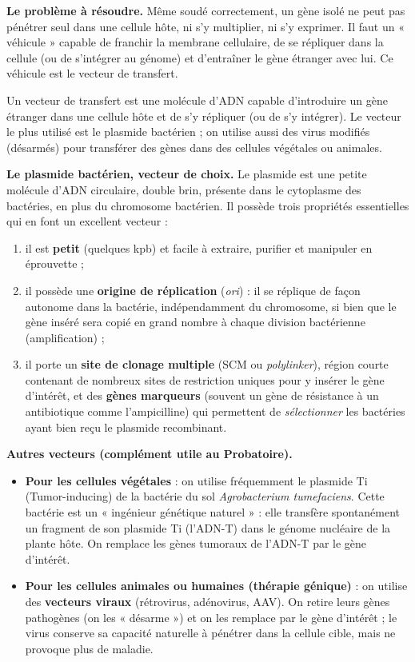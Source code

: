 \documentclass[11pt]{article}
\newcommand{\cle}[1]{{\popxbold\color{popdark}#1}}
\begin{document}
\textbf{Le problème à résoudre.} Même soudé correctement, un gène isolé ne peut pas pénétrer seul dans une cellule hôte, ni s'y multiplier, ni s'y exprimer. Il faut un « véhicule » capable de franchir la membrane cellulaire, de se répliquer dans la cellule (ou de s'intégrer au génome) et d'entraîner le gène étranger avec lui. Ce véhicule est le vecteur de transfert.

\begin{definition}
Un \cle{vecteur de transfert} est une molécule d'ADN capable d'introduire un gène étranger dans une cellule hôte et de s'y répliquer (ou de s'y intégrer). Le vecteur le plus utilisé est le \cle{plasmide} bactérien ; on utilise aussi des virus modifiés (désarmés) pour transférer des gènes dans des cellules végétales ou animales.
\end{definition}

\textbf{Le plasmide bactérien, vecteur de choix.} Le \cle{plasmide} est une petite molécule d'ADN circulaire, double brin, présente dans le cytoplasme des bactéries, en plus du chromosome bactérien. Il possède trois propriétés essentielles qui en font un excellent vecteur :
\begin{enumerate}
\item il est \textbf{petit} (quelques kpb) et facile à extraire, purifier et manipuler en éprouvette ;
\item il possède une \textbf{origine de réplication} (\emph{ori}) : il se réplique de façon autonome dans la bactérie, indépendamment du chromosome, si bien que le gène inséré sera copié en grand nombre à chaque division bactérienne (amplification) ;
\item il porte un \textbf{site de clonage multiple} (SCM ou \emph{polylinker}), région courte contenant de nombreux sites de restriction uniques pour y insérer le gène d'intérêt, et des \textbf{gènes marqueurs} (souvent un gène de résistance à un antibiotique comme l'ampicilline) qui permettent de \emph{sélectionner} les bactéries ayant bien reçu le plasmide recombinant.
\end{enumerate}

\textbf{Autres vecteurs (complément utile au Probatoire).}
\begin{itemize}
\item \textbf{Pour les cellules végétales} : on utilise fréquemment le plasmide Ti (Tumor-inducing) de la bactérie du sol \emph{Agrobacterium tumefaciens}. Cette bactérie est un « ingénieur génétique naturel » : elle transfère spontanément un fragment de son plasmide Ti (l'ADN-T) dans le génome nucléaire de la plante hôte. On remplace les gènes tumoraux de l'ADN-T par le gène d'intérêt.
\item \textbf{Pour les cellules animales ou humaines (thérapie génique)} : on utilise des \textbf{vecteurs viraux} (rétrovirus, adénovirus, AAV). On retire leurs gènes pathogènes (on les « désarme ») et on les remplace par le gène d'intérêt ; le virus conserve sa capacité naturelle à pénétrer dans la cellule cible, mais ne provoque plus de maladie.
\end{itemize}
\end{document}

